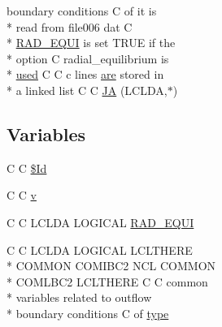 \begin{DoxyCompactItemize}
boundary conditions C of it is \\*
read from file006 dat C \\*
\hyperlink{msa20_2home_2abonfi_2_c_f_d__codes_2_eul_f_s_83_82_83_2include_2ibc2_8com_a5e52771773c3d7155ccec9942c9d7d87}{R\-A\-D\-\_\-\-E\-Q\-U\-I} is set T\-R\-U\-E if the \\*
option C radial\-\_\-equilibrium is \\*
\hyperlink{msa20_2home_2abonfi_2_c_f_d__codes_2_eul_f_s_83_82_83_2include_2stream_8com_a3291a21585d0aec360cd82d75bf51496}{used} C C c lines \hyperlink{msa20_2home_2abonfi_2_c_f_d__codes_2_eul_f_s_83_82_83_2include_2ibc8_8com_a7f7721a0bb3c1d35cfbfbcfd6efc1548}{are} stored in \\*
a linked list C C \hyperlink{msa20_2home_2abonfi_2_c_f_d__codes_2_eul_f_s_83_82_83_2include_2ibc2_8com_af199d7d60a8f42163bb27e1d8108fedb}{J\-A} (L\-C\-L\-D\-A,$\ast$)
\end{DoxyCompactItemize}
\subsection*{Variables}
\begin{DoxyCompactItemize}
\item 
C C \hyperlink{msa20_2home_2abonfi_2_c_f_d__codes_2_eul_f_s_83_82_83_2include_2ibc2_8com_af40bd3a96fc1553c00422342f92046b8}{\$\-Id}
\item 
C C \hyperlink{msa20_2home_2abonfi_2_c_f_d__codes_2_eul_f_s_83_82_83_2include_2ibc2_8com_a8961853e9a171af64fe80e35da93a2e0}{v}
\item 
C C L\-C\-L\-D\-A L\-O\-G\-I\-C\-A\-L \hyperlink{msa20_2home_2abonfi_2_c_f_d__codes_2_eul_f_s_83_82_83_2include_2ibc2_8com_a5e52771773c3d7155ccec9942c9d7d87}{R\-A\-D\-\_\-\-E\-Q\-U\-I}
\item 
C C L\-C\-L\-D\-A L\-O\-G\-I\-C\-A\-L L\-C\-L\-T\-H\-E\-R\-E \\*
C\-O\-M\-M\-O\-N C\-O\-M\-I\-B\-C2 N\-C\-L C\-O\-M\-M\-O\-N \\*
C\-O\-M\-L\-B\-C2 L\-C\-L\-T\-H\-E\-R\-E C C common \\*
variables related to outflow \\*
boundary conditions C of \hyperlink{msa20_2home_2abonfi_2_c_f_d__codes_2_eul_f_s_83_82_83_2include_2ibc2_8com_a2b68f0032c5a5129886c29c634a37223}{type}
\end{DoxyCompactItemize}


